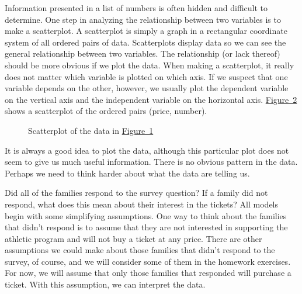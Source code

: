 \documentclass[10pt,]{book}
\theoremstyle{ptxdefinitionnotitle}
\theoremstyle{ptxdefinitiontitle}
\numberwithin{equation}{section}
\begin{document}
\par
\hypertarget{p-17}{}%
Information presented in a list of numbers is often hidden and difficult to determine. One step in analyzing the relationship between two variables is to make a scatterplot. A scatterplot is simply a graph in a rectangular coordinate system of all ordered pairs of data. Scatterplots display data so we can see the general relationship between two variables. The relationship (or lack thereof) should be more obvious if we plot the data. When making a scatterplot, it really does not matter which variable is plotted on which axis. If we suspect that one variable depends on the other, however, we usually plot the dependent variable on the vertical axis and the independent variable on the horizontal axis. \hyperref[scatterplot-of-the-ticket-data]{Figure~2} shows a scatterplot of the ordered pairs (price, number).%
\begin{figure}
\centering
{
}
\caption{Scatterplot of the data in \hyperref[results-of-the-survey]{Figure~1}\label{scatterplot-of-the-ticket-data}}
\end{figure}
\hypertarget{p-18}{}%
It is always a good idea to plot the data, although this particular plot does not seem to give us much useful information. There is no obvious pattern in the data. Perhaps we need to think harder about what the data are telling us.%
\par
\hypertarget{p-19}{}%
Did all of the families respond to the survey question? If a family did not respond, what does this mean about their interest in the tickets? All models begin with some simplifying assumptions. One way to think about the families that didn’t respond is to assume that they are not interested in supporting the athletic program and will not buy a ticket at any price. There are other assumptions we could make about those families that didn’t respond to the survey, of course, and we will consider some of them in the homework exercises. For now, we will assume that only those families that responded will purchase a ticket. With this assumption, we can interpret the data.%
\end{document}
